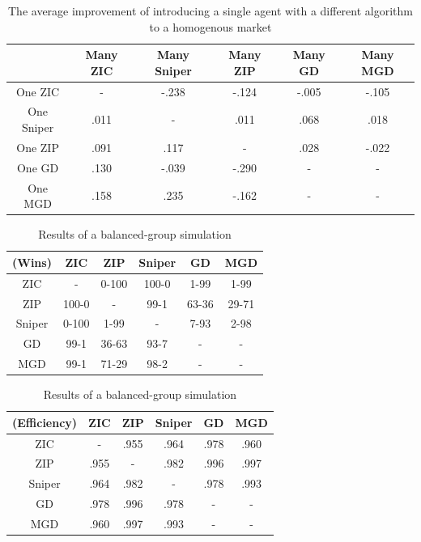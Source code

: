 \documentclass[11pt,a4paper]{article}
\begin{document}
  \begin{table}[ht!]
    \centering
    \begin{tabular}{|c|c|c|c|c|c|}
      \hline
      &Many ZIC&Many Sniper&Many ZIP& Many GD&Many MGD\\
      \hline
      One ZIC&-&-.238&-.124&-.005&-.105\\
      One Sniper&.011&-&.011&.068&.018\\
      One ZIP&.091&.117&-&.028&-.022\\
      One GD&.130&-.039&-.290&-&-\\
      One MGD&.158&.235&-.162&-&-\\
      \hline
    \end{tabular}
    \caption{The average improvement of introducing a single agent with a different algorithm to a homogenous market}
    \label{tab_OneInMany}
  \end{table}

  \begin{table}[ht!]
    \tiny\centering
    \begin{tabular}{|c|c|c|c|c|c|}
      \hline
      (Wins)&ZIC&ZIP&Sniper&GD&MGD\\
      \hline
      ZIC&-&0-100&100-0&1-99&1-99\\
      ZIP&100-0&-&99-1&63-36&29-71\\
      Sniper&0-100&1-99&-&7-93&2-98\\
      GD&99-1&36-63&93-7&-&-\\
      MGD&99-1&71-29&98-2&-&-\\
      \hline
    \end{tabular}
    \begin{tabular}{|c|c|c|c|c|c|}
      \hline
      (Efficiency)&ZIC&ZIP&Sniper&GD&MGD\\
      \hline
      ZIC&-&.955&.964&.978&.960\\
      ZIP&.955&-&.982&.996&.997\\
      Sniper&.964&.982&-&.978&.993\\
      GD&.978&.996&.978&-&-\\
      MGD&.960&.997&.993&-&-\\
      \hline
    \end{tabular}
    \caption{Results of a balanced-group simulation}
    \label{tab_BalanceGroup}
  \end{table}
\end{document}
